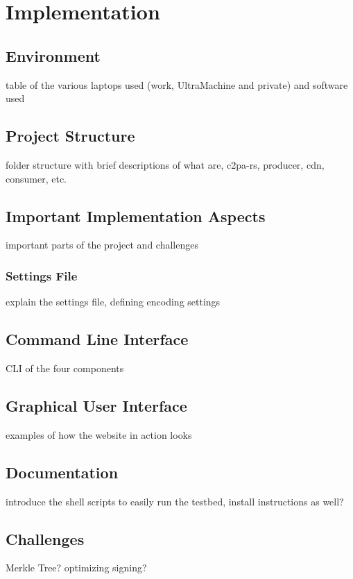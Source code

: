 \chapter{Implementation\label{cha:chapter5}}



\section{Environment\label{sec:env}}

table of the various laptops used (work, UltraMachine and private) and software used

\section{Project Structure\label{sec:projectstructure}}

folder structure with brief descriptions of what are, c2pa-rs, producer, cdn, consumer, etc.

\section{Important Implementation Aspects\label{sec:implaspects}}

important parts of the project and challenges

\subsection{Settings File\label{sec:settings}}

explain the settings file, defining encoding settings

\section{Command Line Interface\label{sec:cli}}

CLI of the four components

\section{Graphical User Interface\label{sec:gui}}

examples of how the website in action looks

\section{Documentation\label{sec:docu}}

introduce the shell scripts to easily run the testbed, install instructions as well?

\section{Challenges}

Merkle Tree? optimizing signing?


